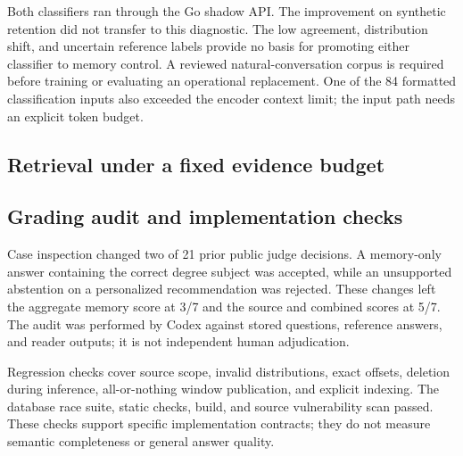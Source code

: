 Both classifiers ran through the Go shadow API. The improvement on synthetic retention did not transfer to this diagnostic. The low agreement, distribution shift, and uncertain reference labels provide no basis for promoting either classifier to memory control. A reviewed natural-conversation corpus is required before training or evaluating an operational replacement. One of the 84 formatted classification inputs also exceeded the encoder context limit; the input path needs an explicit token budget.

\subsection{Retrieval under a fixed evidence budget}


\subsection{Grading audit and implementation checks}
Case inspection changed two of 21 prior public judge decisions. A memory-only answer containing the correct degree subject was accepted, while an unsupported abstention on a personalized recommendation was rejected. These changes left the aggregate memory score at 3/7 and the source and combined scores at 5/7. The audit was performed by Codex against stored questions, reference answers, and reader outputs; it is not independent human adjudication.

Regression checks cover source scope, invalid distributions, exact offsets, deletion during inference, all-or-nothing window publication, and explicit indexing. The database race suite, static checks, build, and source vulnerability scan passed. These checks support specific implementation contracts; they do not measure semantic completeness or general answer quality.
